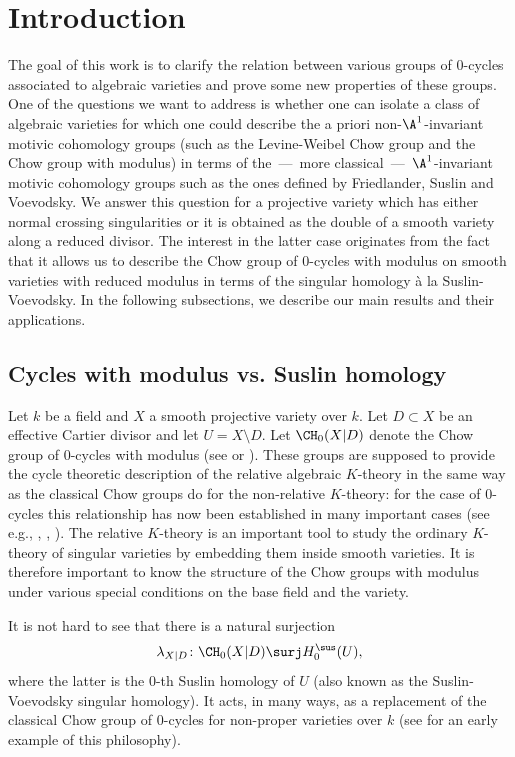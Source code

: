\section{Introduction}\label{sec:Introduction}
The goal of this work is to clarify the relation between various groups of $0$-cycles
associated to algebraic varieties and prove some new properties of these
groups. One of the questions we want to
address is whether one can isolate a class of algebraic varieties
for which one could describe the a priori non-$\A^1$-invariant motivic
cohomology groups (such as the Levine-Weibel Chow group and the Chow group
with modulus) in terms of the~---~more classical~---~$\A^1$-invariant motivic
cohomology groups
such as the ones
defined by Friedlander, Suslin and Voevodsky. We answer this question
for a projective variety which has either normal crossing singularities or
it is obtained as the double of a smooth variety along a reduced divisor.
The interest in the latter case originates from the fact that it
allows us to describe the Chow group of $0$-cycles with
modulus on smooth varieties with reduced modulus in terms of
the singular homology à la Suslin-Voevodsky.
In the following subsections, we describe our main results and their
applications.\enlargethispage{\baselineskip}%

\subsection{Cycles with modulus vs. Suslin homology}\label{sec:CM}
Let $k$ be a field and $X$ a smooth projective variety over $k$.
Let $D \subset X$ be an effective Cartier divisor and let $U = X \setminus D$.
Let $\CH_0(X|D)$ denote
the Chow group of $0$-cycles with modulus (see \cite{KS} or \cite{BS}).
These groups are supposed to provide the cycle theoretic
description of the relative algebraic $K$-theory in the same way as
the classical Chow groups do for the non-relative $K$-theory: for the case of $0$-cycles this relationship has now been established in many important cases (see e.g., \cite{BKS}, \cite{GKris2}, \cite{GKris}).
The relative $K$-theory is an important tool to study the ordinary
$K$-theory of singular varieties by embedding them inside smooth varieties.
It is therefore important to know the structure of the Chow groups with modulus
under various special conditions on the base field and the variety.

It is not hard to see that
there is a natural surjection
\[
\lambda_{X|D}\colon \CH_0(X|D) \surj H^{\sus}_0(U),
\]
where
the latter is the 0-th Suslin homology of $U$ (also known as the
Suslin-Voevodsky singular homology). It acts, in many ways, as a replacement of the
classical Chow group of $0$-cycles for non-proper varieties over $k$ (see \cite{SS} for
an early example of this philosophy).

